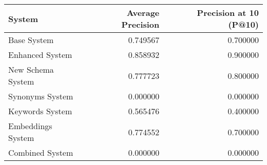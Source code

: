 \begin{tabular}{lrr}
\toprule
System & Average Precision & Precision at 10 (P@10) \\
\midrule
Base System & 0.749567 & 0.700000 \\
Enhanced System & 0.858932 & 0.900000 \\
New Schema System & 0.777723 & 0.800000 \\
Synonyms System & 0.000000 & 0.000000 \\
Keywords System & 0.565476 & 0.400000 \\
Embeddings System & 0.774552 & 0.700000 \\
Combined System & 0.000000 & 0.000000 \\
\bottomrule
\end{tabular}
